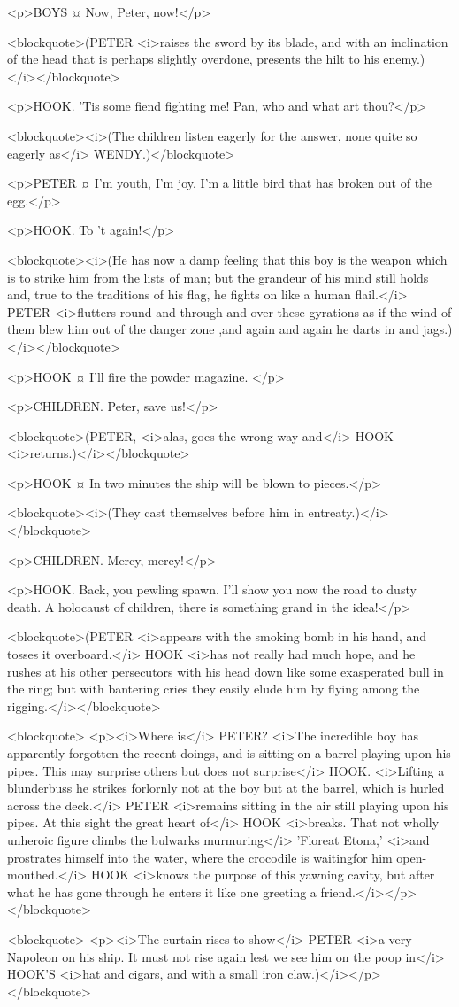 <p>BOYS ¤
Now, Peter, now!</p>

<blockquote>(PETER <i>raises the sword by its blade, and with an inclination of the head that is perhaps slightly overdone, presents the hilt to his enemy.)</i></blockquote>

<p>HOOK. 'Tis some fiend fighting me! Pan, who and what art thou?</p>

<blockquote><i>(The children listen eagerly for the answer, none quite so eagerly as</i> WENDY.)</blockquote>

<p>PETER ¤
I'm youth, I'm joy, I'm a little bird that has broken out of the egg.</p>

<p>HOOK. To 't again!</p>

<blockquote><i>(He has now a damp feeling that this boy is the weapon which is to strike him from the lists of man; but the grandeur of his mind still holds and, true to the traditions of his flag, he fights on like a human flail.</i> PETER <i>flutters round and through and over these gyrations as if the wind of them blew him out of the danger zone ,and again and again he darts in and jags.)</i></blockquote>

<p>HOOK ¤
I'll fire the powder magazine.
</p>

<p>CHILDREN. Peter, save us!</p>

<blockquote>(PETER, <i>alas, goes the wrong way and</i> HOOK <i>returns.)</i></blockquote>

<p>HOOK ¤
In two minutes the ship will be blown to pieces.</p>

<blockquote><i>(They cast themselves before him in entreaty.)</i></blockquote>

<p>CHILDREN. Mercy, mercy!</p>

<p>HOOK. Back, you pewling spawn. I'll show you now the road to dusty death. A holocaust of children, there is something grand in the idea!</p>

<blockquote>(PETER <i>appears with the smoking bomb in his hand, and tosses it overboard.</i> HOOK <i>has not really had much hope, and he rushes at his other persecutors with his head down like some exasperated bull in the ring; but with bantering cries they easily elude him by flying among the rigging.</i></blockquote>

<blockquote> <p><i>Where is</i> PETER? <i>The incredible boy has apparently forgotten the recent doings, and is sitting on a barrel playing upon his pipes. This may surprise others but does not surprise</i> HOOK. <i>Lifting a blunderbuss he strikes forlornly not at the boy but at the barrel, which is hurled across the deck.</i> PETER <i>remains sitting in the air still playing upon his pipes. At this sight the great heart of</i> HOOK <i>breaks. That not wholly unheroic figure climbs the bulwarks murmuring</i> 'Floreat Etona,' <i>and prostrates himself into the water, where the crocodile is waitingfor him open-mouthed.</i> HOOK <i>knows the purpose of this yawning cavity, but after what he has gone through he enters it like one greeting a friend.</i></p> </blockquote>

<blockquote> <p><i>The curtain rises to show</i> PETER <i>a very Napoleon on his ship. It must not rise again lest we see him on the poop in</i> HOOK'S <i>hat and cigars, and with a small iron claw.)</i></p> </blockquote>
